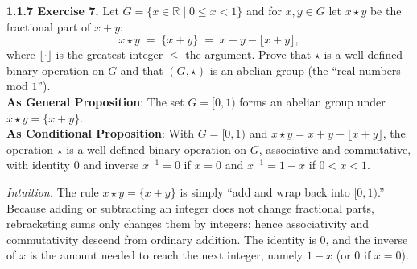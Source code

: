 \documentclass[12pt]{article}
\theoremstyle{definition}
\begin{document}
\newpage

\noindent \textbf{1.1.7 Exercise 7.} Let $G=\{x\in\mathbb{R}\mid 0\le x<1\}$ and for $x,y\in G$ let $x\star y$ be the fractional part of $x+y$:
\[
x\star y \;=\; \{x+y\}\;=\;x+y-\lfloor x+y\rfloor ,
\]
where $\lfloor\cdot\rfloor$ is the greatest integer $\le$ the argument. Prove that $\star$ is a well-defined binary operation on $G$ and that $(G,\star)$ is an abelian group (the “real numbers mod $1$”).\\ %

\noindent\textbf{As General Proposition}: The set $G=[0,1)$ forms an abelian group under $x\star y=\{x+y\}$.\\

\noindent \textbf{As Conditional Proposition}: With $G=[0,1)$ and $x\star y=x+y-\lfloor x+y\rfloor$, the operation $\star$ is a well-defined binary operation on $G$, associative and commutative, with identity $0$ and inverse $x^{-1}=0$ if $x=0$ and $x^{-1}=1-x$ if $0<x<1$.\\

\newpage

\dotfill

\emph{Intuition.} The rule $x\star y=\{x+y\}$ is simply “add and wrap back into $[0,1)$.” Because adding or subtracting an integer does not change fractional parts, rebracketing sums only changes them by integers; hence associativity and commutativity descend from ordinary addition. The identity is $0$, and the inverse of $x$ is the amount needed to reach the next integer, namely $1-x$ (or $0$ if $x=0$).\\

\dotfill
\end{document}
